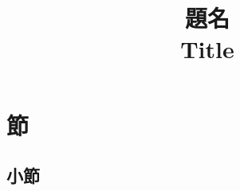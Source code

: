 \documentclass[conference,compsoc,a4paper]{IEEEtran}
\title{
  \vskip-10mm\mdseries\mcfamily
  題名\\
  Title
  \vspace{-3mm}
}
\author{
  \IEEEauthorblockN{
    \normalfont
    姓 名\IEEEauthorrefmark{1}\\
    Last First
  }
  \IEEEauthorblockA{
    \normalfont
    所属\\
    Email: 
    \thanks{
      \normalfont
      \IEEEauthorrefmark{1}Supervisor: Prof. 
    }
    \vspace{-3mm}
  }
}
\begin{document}
\maketitle

\begin{abstract}
\end{abstract}

\section{節}

\subsection{小節}


\printbibliography[title={参考文献}]

\vspace{-0.2mm}
\end{document}
